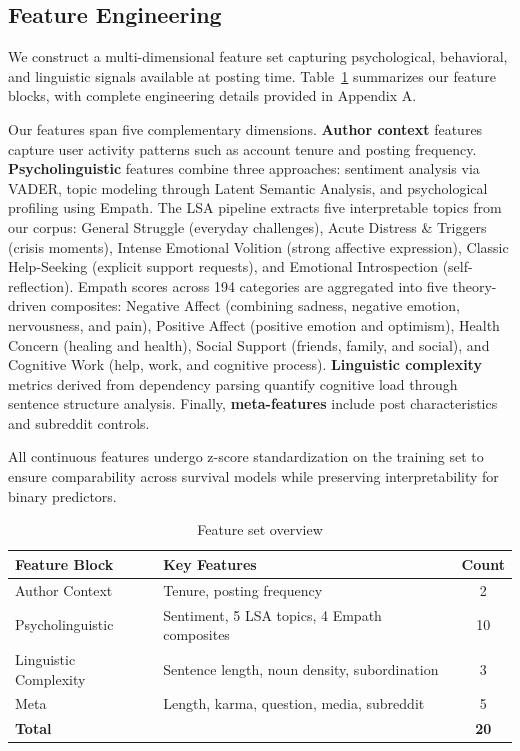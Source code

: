 \documentclass[letterpaper]{article} %
\begin{document}
\subsection{Feature Engineering}

We construct a multi-dimensional feature set capturing psychological, behavioral, and linguistic signals available at posting time. Table~\ref{tab:features} summarizes our feature blocks, with complete engineering details provided in Appendix A.

Our features span five complementary dimensions. \textbf{Author context} features capture user activity patterns such as account tenure and posting frequency. \textbf{Psycholinguistic} features combine three approaches: sentiment analysis via VADER, topic modeling through Latent Semantic Analysis, and psychological profiling using Empath. The LSA pipeline extracts five interpretable topics from our corpus: General Struggle (everyday challenges), Acute Distress \& Triggers (crisis moments), Intense Emotional Volition (strong affective expression), Classic Help-Seeking (explicit support requests), and Emotional Introspection (self-reflection). Empath scores across 194 categories are aggregated into five theory-driven composites: Negative Affect (combining sadness, negative emotion, nervousness, and pain), Positive Affect (positive emotion and optimism), Health Concern (healing and health), Social Support (friends, family, and social), and Cognitive Work (help, work, and cognitive process). \textbf{Linguistic complexity} metrics derived from dependency parsing quantify cognitive load through sentence structure analysis. Finally, \textbf{meta-features} include post characteristics and subreddit controls.

All continuous features undergo z-score standardization on the training set to ensure comparability across survival models while preserving interpretability for binary predictors.

\begin{table}[h]
\centering
\caption{Feature set overview}
\label{tab:features}
\fontsize{8pt}{10pt}\selectfont 
\setlength{\tabcolsep}{1pt}
\begin{tabular}{@{}llc@{}}
\toprule
\textbf{Feature Block} & \textbf{Key Features} & \textbf{Count} \\
\midrule
Author Context & Tenure, posting frequency & 2 \\
Psycholinguistic & Sentiment, 5 LSA topics, 4 Empath composites & 10 \\
Linguistic Complexity & Sentence length, noun density, subordination & 3 \\
Meta  & Length, karma, question, media, subreddit & 5 \\
\midrule
\textbf{Total} & & \textbf{20} \\
\bottomrule
\end{tabular}
\end{table}
\end{document}
